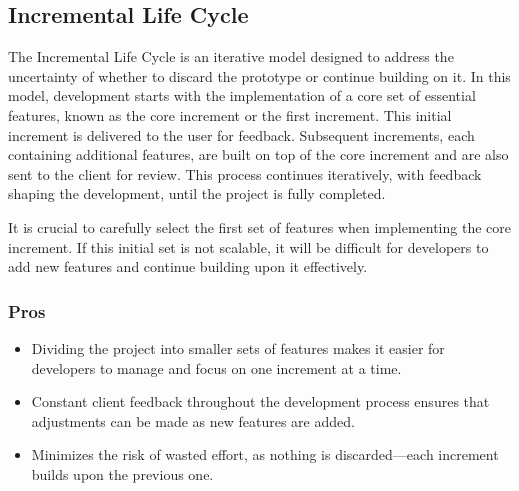 \vspace{1cm}
\subsection{Incremental Life Cycle}
The Incremental Life Cycle is an iterative model designed to address the uncertainty of whether to discard the prototype or
continue building on it. 
In this model, development starts with the implementation of a core set of essential features, known as the core increment or
the first increment. This initial increment is delivered to the user for feedback. 
Subsequent increments, each containing additional features, are built on top of the core increment and are also sent to the 
client for review. This process continues iteratively, with feedback shaping the development, until the project is fully completed.

\vspace{0.5cm}
\begin{tcolorbox}[title = Note]
    It is crucial to carefully select the first set of features when implementing the core increment. If this initial set
    is not scalable, it will be difficult for developers to add new features and continue building upon it effectively.
\end{tcolorbox}

\vspace{2cm}
\begin{center}
\end{center}

\subsubsection{Pros}
\begin{itemize}
    \item Dividing the project into smaller sets of features makes it easier for developers to manage and focus on one
increment at a time.
    \item Constant client feedback throughout the development process ensures that adjustments can be made as new
features are added.
    \item Minimizes the risk of wasted effort, as nothing is discarded—each increment builds upon the previous one.
\end{itemize}

